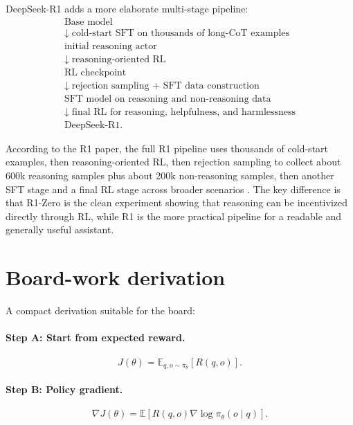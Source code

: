 \documentclass[11pt]{article}
\newcommand{\E}{\mathbb{E}}
\begin{document}
DeepSeek-R1 adds a more elaborate multi-stage pipeline:
\begin{equation}
\begin{array}{c}
\text{Base model} \\
\downarrow \; \text{cold-start SFT on thousands of long-CoT examples} \\
\text{initial reasoning actor} \\
\downarrow \; \text{reasoning-oriented RL} \\
\text{RL checkpoint} \\
\downarrow \; \text{rejection sampling + SFT data construction} \\
\text{SFT model on reasoning and non-reasoning data} \\
\downarrow \; \text{final RL for reasoning, helpfulness, and harmlessness} \\
\text{DeepSeek-R1.}
\end{array}
\end{equation}

According to the R1 paper, the full R1 pipeline uses thousands of cold-start examples, then reasoning-oriented RL, then rejection sampling to collect about 600k reasoning samples plus about 200k non-reasoning samples, then another SFT stage and a final RL stage across broader scenarios \cite{guo2025r1}. The key difference is that R1-Zero is the clean experiment showing that reasoning can be incentivized directly through RL, while R1 is the more practical pipeline for a readable and generally useful assistant.

\section{Board-work derivation}

A compact derivation suitable for the board:

\paragraph{Step A: Start from expected reward.}
\begin{equation}
J(\theta)=\E_{q,o\sim\pi_\theta}[R(q,o)].
\end{equation}

\paragraph{Step B: Policy gradient.}
\begin{equation}
\nabla J(\theta)=\E[R(q,o)\nabla\log\pi_\theta(o\mid q)].
\end{equation}
\end{document}
